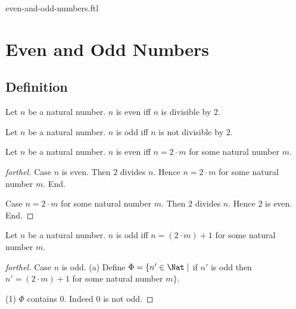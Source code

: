 \documentclass{naproche-library}
\begin{document}
\begin{smodule}{even-and-odd-numbers.ftl}

  \section*{Even and Odd Numbers}

  \subsection*{Definition}

  \begin{definition}[forthel,id=ARITHMETIC_15_4521358965847512,printid]
    Let $n$ be a natural number.
    $n$ is even iff $n$ is divisible by $2$.
  \end{definition}

  \begin{definition}[forthel,id=ARITHMETIC_15_1023652125874596,printid]
    Let $n$ be a natural number.
    $n$ is odd iff $n$ is not divisible by $2$.
  \end{definition}

  \begin{proposition}[forthel,id=ARITHMETIC_15_0236985458752156,printid]
    Let $n$ be a natural number.
    $n$ is even iff $n = 2 \cdot m$ for some natural number $m$.
  \end{proposition}
  \begin{proof}[forthel]
    Case $n$ is even.
      Then $2$ divides $n$.
      Hence $n = 2 \cdot m$ for some natural number $m$.
    End.

    Case $n = 2 \cdot m$ for some natural number $m$.
      Then $2$ divides $n$.
      Hence $2$ is even.
    End.
  \end{proof}

  \begin{proposition}[forthel,id=ARITHMETIC_15_1023512547854265,printid]
    Let $n$ be a natural number.
    $n$ is odd iff $n = (2 \cdot m) + 1$ for some natural number $m$.
  \end{proposition}
  \begin{proof}[forthel]
    Case $n$ is odd.
      (a) Define $\Phi = \{ n' \in \Nat \mid$ if $n'$ is odd then $n' = (2 \cdot m) + 1$ for some natural number $m \}$.

      (1) $\Phi$ contains $0$.
      Indeed $0$ is not odd.


\end{proof}
\end{smodule}
\end{document}
